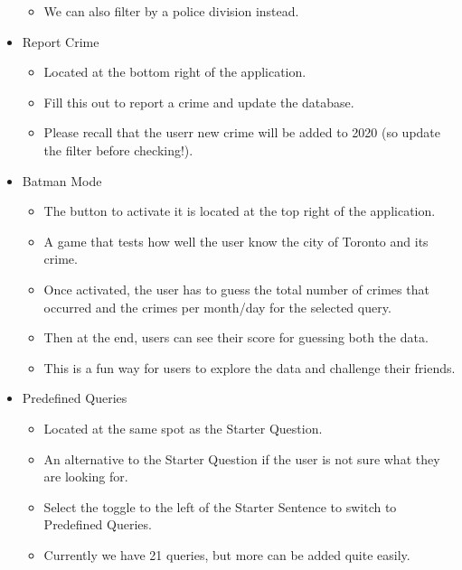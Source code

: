\documentclass[12pt, a4paper]{article}
\begin{document}
\begin{itemize}
\begin{itemize}
        \item We can also filter by a police division instead.
    \end{itemize}
    \item Report Crime
    \begin{itemize}
        \item Located at the bottom right of the application.
        \item Fill this out to report a crime and update the database.
        \item Please recall that the userr new crime will be added to 2020 (so update the filter before checking!).
    \end{itemize}
    \item Batman Mode
    \begin{itemize}
        \item The button to activate it is located at the top right of the application.
        \item A game that tests how well the user know the city of Toronto and its crime. 
        \item Once activated, the user has to guess the total number of crimes that occurred and the crimes per month/day for the selected query.
        \item Then at the end, users can see their score for guessing both the data.
        \item This is a fun way for users to explore the data and challenge their friends.
    \end{itemize}
    \item Predefined Queries
    \begin{itemize}
        \item Located at the same spot as the Starter Question.
        \item An alternative to the Starter Question if the user is not sure what they are looking for.
        \item Select the toggle to the left of the Starter Sentence to switch to Predefined Queries.
        \item Currently we have 21 queries, but more can be added quite easily.
    \end{itemize}
\end{itemize}
\end{document}
